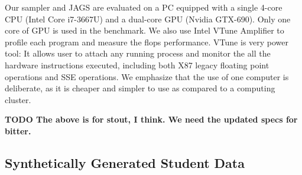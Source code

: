 \documentclass{article} %
\begin{document}
Our sampler and JAGS are evaluated on a PC equipped with a single 4-core CPU (Intel Core i7-3667U)
and a dual-core GPU (Nvidia GTX-690). Only one core of GPU is used in the benchmark. We also use
Intel VTune Amplifier to profile each program and measure the flops performance. VTune is very power
tool: It allows user to attach any running process and monitor the all the hardware instructions
executed, including both X87 legacy floating point operations and SSE operations.  We emphasize that
the use of one computer is deliberate, as it is cheaper and simpler to use as compared to a
computing cluster.

\textbf{TODO The above is for stout, I think. We need the updated specs for bitter.}

\subsection{Synthetically Generated Student Data}\label{ssec:student_data}
\end{document}
